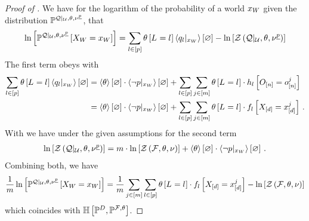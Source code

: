 \begin{proof}[Proof of ]
    We have for the logarithm of the probability of a world $x_{W}$ given the distribution $\mathbb{P}^{{\mathcal{Q}}|_{\mathcal{U}},\theta,\nu^{\underline{p}}}$, that
    \begin{align*}
        \ln \left[ \mathbb{P}^{{\mathcal{Q}}|_{\mathcal{U}},\theta,\nu^{\underline{p}}}\left[X_{W}=x_{W}\right] \right]
        =  \sum_{l\in[p]} \theta\left[L_{}=l_{}\right] \left\langle {q_{l}}|_{x_{W}}\right\rangle \left[ \varnothing \right] - \ln \left[ \mathcal{Z}\left({\mathcal{Q}}|_{\mathcal{U}},\theta,\nu^{\underline{p}}\right) \right]
    \end{align*}
    The first term obeys with 
    \begin{align*}
        \sum_{l\in[p]} \theta\left[L_{}=l_{}\right] \left\langle {q_{l}}|_{x_{W}}\right\rangle \left[ \varnothing \right]
        &=  \left\langle \theta\right\rangle \left[ \varnothing \right] \cdot \left\langle {\lnot p}|_{x_{W}}\right\rangle \left[ \varnothing \right]
        + \sum_{l\in[p]}\sum_{j\in[m]} \theta\left[L_{}=l_{}\right] \cdot h_{l}\left[O_{[n]}=o_{[n]}^{j}\right] \\
        &= \left\langle \theta\right\rangle \left[ \varnothing \right] \cdot \left\langle {\lnot p}|_{x_{W}}\right\rangle \left[ \varnothing \right]
        + \sum_{l\in[p]}\sum_{j\in[m]} \theta\left[L_{}=l_{}\right] \cdot f_{l}\left[X_{[d]}=x_{[d]}^{j}\right] \, .
    \end{align*}
    With  we have under the given assumptions for the second term
    \begin{align*}
        \ln \left[ \mathcal{Z}\left({\mathcal{Q}}|_{\mathcal{U}},\theta,\nu^{\underline{p}}\right) \right] = m \cdot \ln \left[ \mathcal{Z}\left(\mathcal{F},\theta,\nu\right) \right]  + \left\langle \theta\right\rangle \left[ \varnothing \right] \cdot \left\langle {\lnot p}|_{x_{W}}\right\rangle \left[ \varnothing \right] \, .
    \end{align*}
    Combining both, we have
    \begin{align*}
        \frac{1}{m} \ln \left[ \mathbb{P}^{{\mathcal{Q}}|_{\mathcal{U}},\theta,\nu^{\underline{p}}}\left[X_{W}=x_{W}\right] \right]
        =  \frac{1}{m}\sum_{j\in[m]}\sum_{l\in[p]} \theta\left[L_{}=l_{}\right] \cdot f_{l}\left[X_{[d]}=x_{[d]}^{j}\right]  - \ln \left[ \mathcal{Z}\left(\mathcal{F},\theta,\nu\right) \right]
    \end{align*}
    which coincides with $\mathbb{H}\left[\mathbb{P}^{D},\mathbb{P}^{\mathcal{F},\theta}\right]$.
\end{proof}

